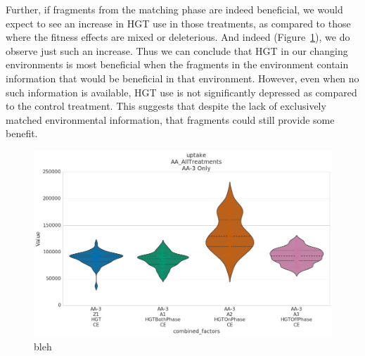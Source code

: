 \documentclass[PhD]{msu-thesis}
\begin{document}
Further, if fragments from the matching phase are indeed beneficial, we would expect to see an increase in HGT use in those treatments, as compared to those where the fitness effects are mixed or deleterious. And indeed (Figure~\ref{fig:hgt_use_by_cycle_phase_source}), we do observe just such an increase. Thus we can conclude that HGT in our
changing environments is most beneficial when the fragments in the environment contain information that would be beneficial in that environment. However, even when no such information is available, HGT use is not significantly depressed as compared to the control treatment. This suggests that despite the lack of exclusively matched environmental information, that fragments could still provide some benefit. 

\begin{figure}[h!]
\begin{center}
\includegraphics[width=0.7\columnwidth]{figures/HGT/hgt_use_by_cycle_phase_source.png}
\caption{bleh%
}\label{fig:hgt_use_by_cycle_phase_source}
\end{center}
\end{figure}


\end{document}
